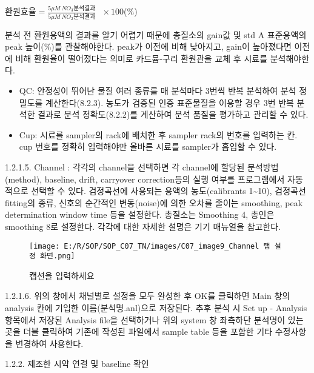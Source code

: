 \documentclass[
]{book}
\begin{document}
\(환원효율= \frac{5\mu M ~ NO_{3} 분석결과}{5\mu M ~ NO_{2} 분석결과}~~~ \times 100\)(\%)

분석 전 환원용액의 결과를 알기 어렵기 때문에 총질소의 gain값 및 std A 표준용액의 peak 높이(\%)를 관찰해야한다. peak가 이전에 비해 낮아지고, gain이 높아졌다면 이전에 비해 환원율이 떨어졌다는 의미로 카드뮴-구리 환원관을 교체 후 시료를 분석해야한다.

\begin{itemize}
\item
  QC: 안정성이 뛰어난 물질 여러 종류를 매 분석마다 3번씩 반복 분석하여 분석 정밀도를 계산한다(8.2.3). 농도가 검증된 인증 표준물질을 이용할 경우 3번 반복 분석한 결과로 분석 정확도(8.2.2)를 계산하여 분석 품질을 평가하고 관리할 수 있다.
\item
  Cup: 시료를 sampler의 rack에 배치한 후 sampler rack의 번호를 입력하는 칸. cup 번호를 정확히 입력해야만 올바른 시료를 sampler가 흡입할 수 있다.
\end{itemize}

1.2.1.5. Channel : 각각의 channel을 선택하면 각 channel에 할당된 분석방법 (method), baseline, drift, carryover correction등의 실행 여부를 프로그램에서 자동적으로 선택할 수 있다. 검정곡선에 사용되는 용액의 농도(calibrants 1\textasciitilde10), 검정곡선 fitting의 종류, 신호의 순간적인 변동(noise)에 의한 오차를 줄이는 smoothing, peak determination window time 등을 설정한다. 총질소는 Smoothing 4, 총인은 smoothing 8로 설정한다. 각각에 대한 자세한 설명은 기기 매뉴얼을 참고한다.

\begin{figure}
\centering
\texttt{[image: E:/R/SOP/SOP\_C07\_TN/images/C07\_image9\_Channel 탭 설정 화면.png]}
\caption{캡션을 입력하세요}
\end{figure}

1.2.1.6. 위의 창에서 채널별로 설정을 모두 완성한 후 OK를 클릭하면 Main 창의 analysis 칸에 기입한 이름(분석명.anl)으로 저장된다. 추후 분석 시 Set up - Analysis 항목에서 저장된 Analysis file을 선택하거나 위의 system 창 좌측하단 분석명이 있는 곳을 더블 클릭하여 기존에 작성된 파일에서 sample table 등을 포함한 기타 수정사항을 변경하여 사용한다.

1.2.2. 제조한 시약 연결 및 baseline 확인
\end{document}
